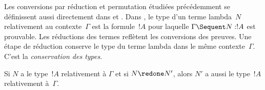 \documentclass[../../../include/open-logic-section]{subfiles}
\begin{document}


Les conversions par réduction et permutation étudiées
précédemment se définissent aussi directement dans
 et .
Dans , le type d'un terme lambda~$N$
relativement au contexte~$\Gamma$ est la formule~$!A$
pour laquelle $\Gamma \Sequent N : !A$ est prouvable.
Les réductions des termes reflètent les conversions
des preuves. Une étape de réduction conserve le type
du terme lambda dans le même contexte~$\Gamma$.
C'est la \emph{conservation des types}.

\begin{prop}
Si $N$ a le type~$!A$ relativement à $\Gamma$
et si $N \redone N'$, alors $N'$ a aussi le type~$!A$
relativement à~$\Gamma$.
\end{prop}
\end{document}
